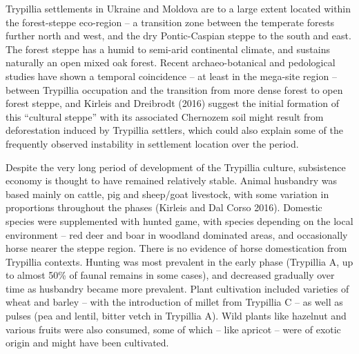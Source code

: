 \documentclass[
  12pt,
  a4paper, twoside]{book}
\begin{document}
Trypillia settlements in Ukraine and Moldova are to a large extent located within the forest-steppe eco-region -- a transition zone between the temperate forests further north and west, and the dry Pontic-Caspian steppe to the south and east. The forest steppe has a humid to semi-arid continental climate, and sustains naturally an open mixed oak forest. Recent archaeo-botanical and pedological studies have shown a temporal coincidence -- at least in the mega-site region -- between Trypillia occupation and the transition from more dense forest to open forest steppe, and Kirleis and Dreibrodt (2016) suggest the initial formation of this ``cultural steppe'' with its associated Chernozem soil might result from deforestation induced by Trypillia settlers, which could also explain some of the frequently observed instability in settlement location over the period.

Despite the very long period of development of the Trypillia culture, subsistence economy is thought to have remained relatively stable. Animal husbandry was based mainly on cattle, pig and sheep/goat livestock, with some variation in proportions throughout the phases (Kirleis and Dal Corso 2016). Domestic species were supplemented with hunted game, with species depending on the local environment -- red deer and boar in woodland dominated areas, and occasionally horse nearer the steppe region. There is no evidence of horse domestication from Trypillia contexts. Hunting was most prevalent in the early phase (Trypillia A, up to almost 50\% of faunal remains in some cases), and decreased gradually over time as husbandry became more prevalent. Plant cultivation included varieties of wheat and barley -- with the introduction of millet from Trypillia C -- as well as pulses (pea and lentil, bitter vetch in Trypillia A). Wild plants like hazelnut and various fruits were also consumed, some of which -- like apricot -- were of exotic origin and might have been cultivated.
\end{document}

